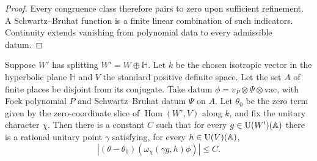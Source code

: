 \begin{proof}
Every congruence class therefore pairs to zero upon sufficient refinement. A Schwartz--Bruhat function is a finite linear combination of such indicators. Continuity extends vanishing from polynomial data to every admissible datum.
\end{proof}

\begin{lemma}
\label{lem:c-false-zero-term-bound}
\emitthmsource
Suppose $W'$ has splitting $W'=W\oplus\mathbb H$. Let $k$ be the chosen isotropic vector in the hyperbolic plane $\mathbb H$ and $V$ the standard positive definite space. Let the set $A$ of finite places be disjoint from its conjugate. Take datum $\phi=v_P\otimes\Psi\otimes\mathrm{vac}$, with Fock polynomial $P$ and Schwartz--Bruhat datum $\Psi$ on $A$. Let $\theta_0$ be the zero term given by the zero-coordinate slice of $\operatorname{Hom}(W',V)$ along $k$, and fix the unitary character $\chi$. Then there is a constant $C$ such that for every $g\in \operatorname{U}(W')(\mathbb A)$ there is a rational unitary point $\gamma$ satisfying, for every $h\in \operatorname{U}(V)(\mathbb A)$,
\[
  |(\theta-\theta_0)(\omega_\chi(\gamma g,h)\phi)|\le C.
\]
\end{lemma}

